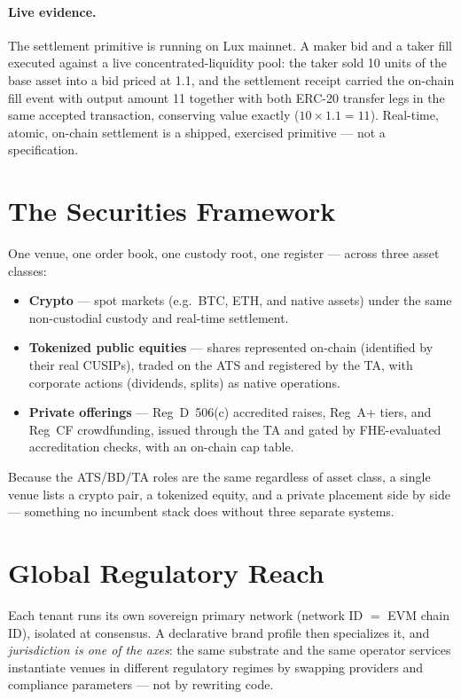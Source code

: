 \documentclass[11pt,a4paper]{article}
\begin{document}
\paragraph{Live evidence.}
The settlement primitive is running on Lux mainnet. A maker bid and a taker
fill executed against a live concentrated-liquidity pool: the taker sold 10
units of the base asset into a bid priced at 1.1, and the settlement receipt
carried the on-chain fill event with output amount 11 together with both
ERC-20 transfer legs in the same accepted transaction, conserving value
exactly ($10 \times 1.1 = 11$). Real-time, atomic, on-chain settlement is a
shipped, exercised primitive --- not a specification.

\section{The Securities Framework}
\label{sec:securities}

One venue, one order book, one custody root, one register --- across three
asset classes:

\begin{itemize}[leftmargin=1.4em]
  \item \textbf{Crypto} --- spot markets (e.g.\ BTC, ETH, and native assets)
        under the same non-custodial custody and real-time settlement.
  \item \textbf{Tokenized public equities} --- shares represented on-chain
        (identified by their real CUSIPs), traded on the ATS and registered by
        the TA, with corporate actions (dividends, splits) as native
        operations.
  \item \textbf{Private offerings} --- Reg~D~506(c) accredited raises, Reg~A+
        tiers, and Reg~CF crowdfunding, issued through the TA and gated by
        FHE-evaluated accreditation checks, with an on-chain cap table.
\end{itemize}

Because the ATS/BD/TA roles are the same regardless of asset class, a single
venue lists a crypto pair, a tokenized equity, and a private placement side by
side --- something no incumbent stack does without three separate systems.

\section{Global Regulatory Reach}
\label{sec:global}

Each tenant runs its own sovereign primary network (network ID $=$ EVM chain
ID), isolated at consensus. A declarative brand profile then specializes it,
and \emph{jurisdiction is one of the axes}: the same substrate and the same
operator services instantiate venues in different regulatory regimes by
swapping providers and compliance parameters --- not by rewriting code.
\end{document}
